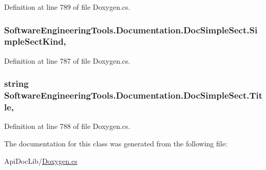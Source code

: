 Definition at line 789 of file Doxygen.\+cs.

\hypertarget{class_software_engineering_tools_1_1_documentation_1_1_doc_simple_sect_a6a4b4036b16ccfb60f48c5e7df50ac40}{
\subsubsection[{Simple\+Sect\+Kind}]{ Software\+Engineering\+Tools.\+Documentation.\+Doc\+Simple\+Sect.\+Simple\+Sect\+Kind\hspace{0.3cm}{\ttfamily [get]}, {\ttfamily [set]}}}\label{class_software_engineering_tools_1_1_documentation_1_1_doc_simple_sect_a6a4b4036b16ccfb60f48c5e7df50ac40}


Definition at line 787 of file Doxygen.\+cs.

\hypertarget{class_software_engineering_tools_1_1_documentation_1_1_doc_simple_sect_a1315d0d038a955a9ba38da4d299f05e2}{
\subsubsection[{Title}]{\setlength{\rightskip}{0pt plus 5cm}string Software\+Engineering\+Tools.\+Documentation.\+Doc\+Simple\+Sect.\+Title\hspace{0.3cm}{\ttfamily [get]}, {\ttfamily [set]}}}\label{class_software_engineering_tools_1_1_documentation_1_1_doc_simple_sect_a1315d0d038a955a9ba38da4d299f05e2}


Definition at line 788 of file Doxygen.\+cs.



The documentation for this class was generated from the following file\+:\begin{DoxyCompactItemize}
\item 
Api\+Doc\+Lib/\hyperlink{_doxygen_8cs}{Doxygen.\+cs}\end{DoxyCompactItemize}
